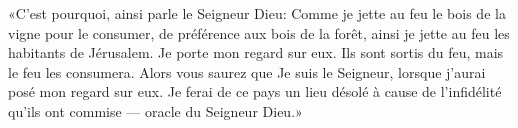 «C’est pourquoi, ainsi parle le Seigneur Dieu:
	Comme je jette au feu le bois de la vigne pour le consumer,
		de préférence aux bois de la forêt,
	ainsi je jette au feu les habitants de Jérusalem.
Je porte mon regard sur eux.
	Ils sont sortis du feu, mais le feu les consumera.
Alors vous saurez que Je suis le Seigneur, lorsque j’aurai posé mon regard sur eux.
Je ferai de ce pays un lieu désolé à cause de l’infidélité qu’ils ont commise
	--- oracle du Seigneur Dieu.»
